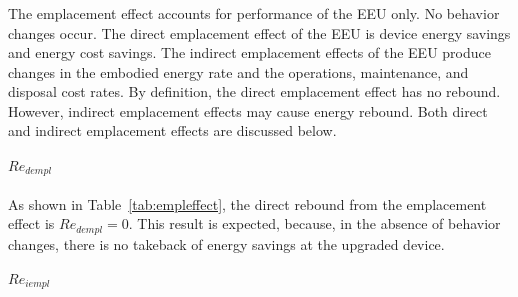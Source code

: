 % 
% 
% 	
%   
%     


\subsubsection{\Empleffect{}}
\label{sec:Re_emp}

The emplacement effect accounts for performance of the EEU only.
No behavior changes occur.
The direct emplacement effect of the EEU is device energy savings and energy cost savings.
The indirect emplacement effects of the EEU produce changes in the embodied energy rate and
the operations, maintenance, and disposal cost rates.
By definition, the direct emplacement effect has no rebound. 
However, indirect emplacement effects may cause energy rebound.
Both direct and indirect emplacement effects are discussed below.


\paragraph{$Re_{dempl}$}
\label{sec:Re_dempl}

As shown in Table~\ref{tab:empleffect},
the direct rebound from the emplacement effect is
$Re_{dempl} = 0$.
This result is expected, 
because, in the absence of behavior changes,
there is no takeback of energy savings
at the upgraded device.


\paragraph{$Re_{iempl}$} 
\label{sec:Re_iempl}

